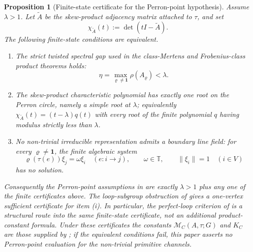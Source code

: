 \documentclass[11pt,a4paper]{amsart}
\theoremstyle{plain}
\newtheorem{proposition}[theorem]{Proposition}
\theoremstyle{definition}
\theoremstyle{remark}
\newcommand{\TT}{\mathbb{T}}
\newcommand{\norm}[1]{\lVert #1 \rVert}
\begin{document}
\begin{proposition}[Finite-state certificate for the Perron-point
  hypothesis]
  \label{prop:eta-gap-finite-state-certificate}
  Assume \(\lambda>1\). Let \(\widetilde A\) be the skew-product
  adjacency matrix attached to \(\tau\), and set
  \[
    \chi_{\widetilde A}(t):=\det(tI-\widetilde A).
  \]
  The following finite-state conditions are equivalent.
  \begin{enumerate}[label=\rm(\roman*)]
  \item The strict twisted spectral gap used in the class-Mertens and
    Frobenius-class product theorems holds:
    \[
      \eta=\max_{\varrho\neq\mathbf 1}\rho(A_\varrho)<\lambda .
    \]
  \item The skew-product characteristic polynomial has exactly one root on
    the Perron circle, namely a simple root at \(\lambda\); equivalently
    \(\chi_{\widetilde A}(t)=(t-\lambda)q(t)\) with every root of the
    finite polynomial \(q\) having modulus strictly less than \(\lambda\).
  \item No non-trivial irreducible representation admits a boundary line
    field: for every \(\varrho\neq\mathbf1\), the finite algebraic system
    \[
      \varrho(\tau(e))\xi_j=\omega\xi_i\quad(e:i\to j),
      \qquad \omega\in\TT,
      \qquad \norm{\xi_i}=1\quad(i\in V)
    \]
    has no solution.
  \end{enumerate}
  Consequently the Perron-point assumptions in
   are
  exactly \(\lambda>1\) plus any one of the finite certificates above.
  The loop-subgroup obstruction of
   gives a one-vertex
  sufficient certificate for item \rm(i).  In particular, the perfect-loop
  criterion of  is a structural route into
  the same finite-state certificate, not an additional product-constant
  formula.
  Under these certificates the constants
  \(\mathcal M_C(A,\tau;G)\) and \(K_C\) are those supplied by
  ; if the
  equivalent conditions fail, this paper asserts no Perron-point
  evaluation for the non-trivial primitive channels.
\end{proposition}
\end{document}

